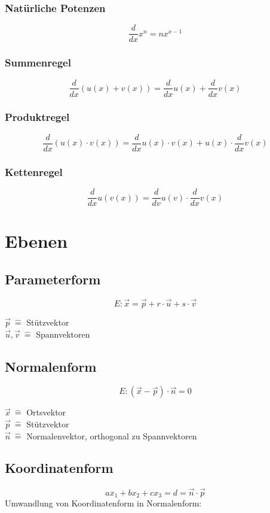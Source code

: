 \documentclass[12pt]{article}
\begin{document}
\subsubsection{Natürliche Potenzen}
\[\frac{d}{dx}x^n = nx^{x-1}\]
\subsubsection{Summenregel}
\[\frac{d}{dx}\left(u(x) + v(x)\right) = \frac{d}{dx}u(x) + \frac{d}{dx}v(x)\]
\subsubsection{Produktregel}
\[\frac{d}{dx}(u(x) \cdot v(x)) = \frac{d}{dx}u(x) \cdot v(x) + u(x) \cdot \frac{d}{dx}v(x)\]
\subsubsection{Kettenregel}
\[\frac{d}{dx}u(v(x)) = \frac{d}{dv}u(v) \cdot \frac{d}{dx}v(x)\]

\newpage
\section{Ebenen}
\subsection{Parameterform}
\[E: \vec{x} = \vec{p} + r \cdot \vec{u} + s \cdot \vec{v}\]
\begin{center}
    $\vec{p} \: \widehat{=}$ Stützvektor \\
    $\vec{u}, \vec{v} \: \widehat{=}$ Spannvektoren
\end{center}
\subsection{Normalenform}
\[E: (\vec{x} - \vec{p}) \cdot \vec{n} = 0\]
\begin{center}
    $\vec{x} \: \widehat{=}$ Ortsvektor \\
    $\vec{p} \: \widehat{=}$ Stützvektor \\
    $\vec{n} \: \widehat{=}$ Normalenvektor, orthogonal zu Spannvektoren
\end{center}
\subsection{Koordinatenform}
\[ax_1 + bx_2 + cx_3 = d = \vec{n} \cdot \vec{p}\]
Umwandlung von Koordinatenform in Normalenform:
\end{document}
